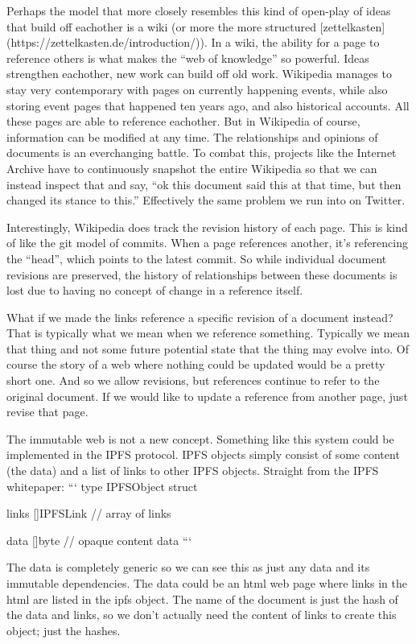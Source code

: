 Perhaps the model that more closely resembles this kind of open-play of ideas that build off eachother is a wiki (or more the more structured [zettelkasten](https://zettelkasten.de/introduction/)). In a wiki, the ability for a page to reference others is what makes the “web of knowledge” so powerful. Ideas strengthen eachother, new work can build off old work. Wikipedia manages to stay very contemporary with pages on currently happening events, while also storing event pages that happened ten years ago, and also historical accounts. All these pages are able to reference eachother. But in Wikipedia of course, information can be modified at any time. The relationships and opinions of documents is an everchanging battle. To combat this, projects like the Internet Archive have to continuously snapshot the entire Wikipedia so that we can instead inspect that and say, “ok this document said this at that time, but then changed its stance to this.” Effectively the same problem we run into on Twitter.

Interestingly, Wikipedia does track the revision history of each page. This is kind of like the git model of commits. When a page references another, it’s referencing the “head”, which points to the latest commit. So while individual document revisions are preserved, the history of relationships between these documents is lost due to having no concept of change in a reference itself.

What if we made the links reference a specific revision of a document instead? That is typically what we mean when we reference something. Typically we mean that thing and not some future potential state that the thing may evolve into. Of course the story of a web where nothing could be updated would be a pretty short one. And so we allow revisions, but references continue to refer to the original document. If we would like to update a reference from another page, just revise that page.

The immutable web is not a new concept. Something like this system could be implemented in the IPFS protocol. IPFS objects simply consist of some content (the data) and a list of links to other IPFS objects. Straight from the IPFS whitepaper:
```
type IPFSObject struct {
    links []IPFSLink
    // array of links

    data []byte
    // opaque content data
```
}

The data is completely generic so we can see this as just any data and its immutable dependencies. The data could be an html web page where links in the html are listed in the ipfs object. The name of the document is just the hash of the data and links, so we don’t actually need the content of links to create this object; just the hashes.

